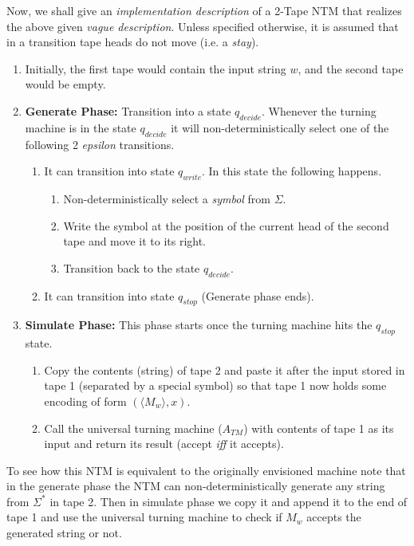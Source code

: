 \begin{soln}
Now, we shall give an \emph{implementation description} of a 2-Tape NTM that realizes the above given \emph{vague description}. Unless specified otherwise, it is assumed that in a transition tape heads do not move (i.e. a \emph{stay}).
\begin{enumerate}
    \item Initially, the first tape would contain the input string $w$, and the second tape would be empty.
    \item \textbf{Generate Phase: } Transition into a state $q_{decide}$. Whenever the turning machine is in the state $q_{decide}$ it will non-deterministically select one of the following 2 \emph{epsilon} transitions.
    \begin{enumerate}
        \item It can transition into state $q_{write}$. In this state the following happens.
        \begin{enumerate}
            \item Non-deterministically select a \emph{symbol} from $\Sigma$.
            \item Write the symbol at the position of the current head of the second tape and move it to its right.
            \item Transition back to the state $q_{decide}$.
        \end{enumerate}
        \item It can transition into state $q_{stop}$ (Generate phase ends).
    \end{enumerate}
    \item \textbf{Simulate Phase: } This phase starts once the turning machine hits the $q_{stop}$ state.
    \begin{enumerate}
        \item Copy the contents (string) of tape 2 and paste it after the input stored in tape 1 (separated by a special symbol) so that tape 1 now holds some encoding of form $(\langle M_w \rangle, x)$.
        \item Call the universal turning machine ($A_{TM}$) with contents of tape 1 as its input and return its result (accept \emph{iff} it accepts).
    \end{enumerate}
\end{enumerate}

To see how this NTM is equivalent to the originally envisioned machine note that in the generate phase the NTM can non-deterministically generate any string from $\Sigma^*$ in tape 2. Then in simulate phase we copy it and append it to the end of tape 1 and use the universal turning machine to check if $M_w$ accepts the generated string or not.
\end{soln}